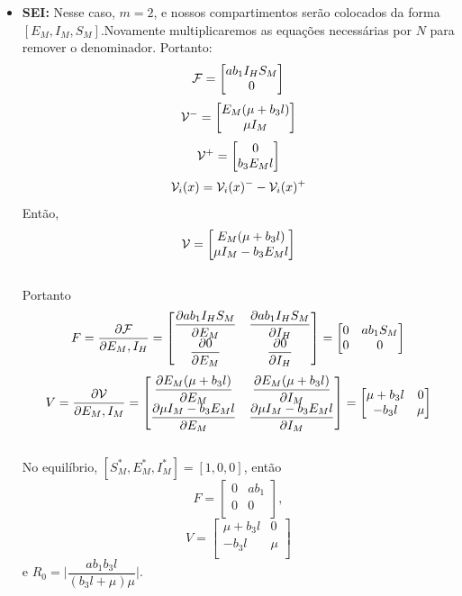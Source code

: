 \documentclass[12pt]{article}
\begin{document}
\begin{itemize}
\item \textbf{SEI:}
Nesse caso, $m=2$, e nossos compartimentos serão colocados da forma $[E_M, I_M, S_M]$.Novamente multiplicaremos as equações necessárias por $N$ para remover o denominador. Portanto:
$$ {\cal F} =\begin{bmatrix}
a b_1 I_H S_M\\
0\\
\end{bmatrix} $$
$$
{\cal V^-} = \begin{bmatrix}
E_M (\mu + b_3 l)\\
\mu I_M
\end{bmatrix}
$$
$$
{\cal V^+} = \begin{bmatrix}
0\\
b_3 E_M l\\
\end{bmatrix}
$$
$${\cal V}_i (x) = {\cal V}_i(x)^{-} - {\cal V}_i(x)^+$$
Então,
$$
{\cal V} =
\begin{bmatrix}
E_M (\mu + b_3 l)\\
\mu I_M - b_3 E_M l\\
\end{bmatrix}
$$
\\
Portanto
$$ F = \dfrac{\partial{\cal F}}{\partial E_M, I_H} =\begin{bmatrix}
\dfrac{\partial ab_1 I_H S_M}{\partial E_M} & \dfrac{\partial ab_1 I_H S_M}{\partial I_H}\\
\dfrac{\partial 0}{\partial E_M} & \dfrac{\partial 0}{\partial I_H}\\
\end{bmatrix} = 
\begin{bmatrix}
0 & ab_1 S_M\\
0 & 0\\
\end{bmatrix}$$
$$ V = \dfrac{\partial{\cal V}}{\partial E_M, I_M} =\begin{bmatrix}
\dfrac{\partial E_M (\mu + b_3 l)}{\partial E_M} & \dfrac{\partial E_M (\mu + b_3 l)}{\partial I_M}\\
\dfrac{\partial \mu I_M - b_3 E_M l}{\partial E_M} & \dfrac{\partial \mu I_M - b_3 E_M l}{\partial I_M}\\
\end{bmatrix} = 
\begin{bmatrix}
\mu+b_3 l & 0\\
- b_3 l & \mu\\
\end{bmatrix}$$
\\No equilíbrio, $[S_M^*, E_M^*, I_M^*] = [1,0,0]$, então $$F=\begin{bmatrix}
0 & ab_1\\
0 & 0\\
\end{bmatrix},$$
$$V = \begin{bmatrix}
\mu+b_3 l & 0\\
- b_3 l & \mu\\
\end{bmatrix}$$ e $R_0 = \Big | \dfrac{ab_1b_3l}{(b_3l+\mu)\mu}\Big | $.


\end{itemize}
\end{document}
